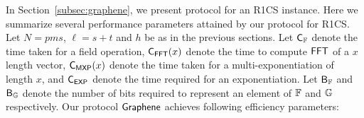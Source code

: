In Section~\ref{subsec:graphene}, we present protocol for an R1CS instance. Here we summarize several performance parameters attained by our protocol for R1CS. Let $N= pms$, $\ell = s+t$ and $h$ be as in the previous sections. Let $\mathsf{C}_\mathbb{F}$ denote the time taken for a field operation, $\mathsf{C}_\mathsf{FFT}(x)$ denote the time to compute $\mathsf{FFT}$ of a $x$ length vector, $\mathsf{C}_\mathsf{MXP}(x)$ denote the time taken for a multi-exponentiation of length $x$, and $\mathsf{C}_\mathsf{EXP}$ denote the time required for an exponentiation. Let $\mathsf{B}_\mathbb{F}$ and $\mathsf{B}_\mathbb{G}$ denote the number of bits required to represent an element of $\mathbb{F}$ and $\mathbb{G}$ respectively. Our protocol $\textsf{Graphene}$ achieves following efficiency parameters: 



